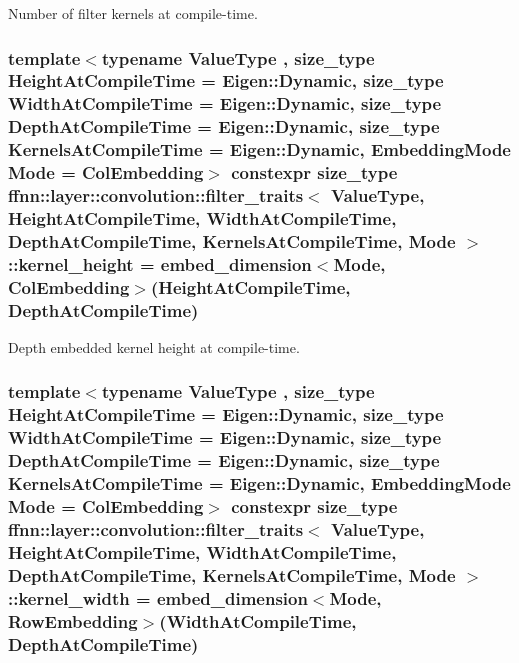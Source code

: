 Number of filter kernels at compile-\/time. 

\hypertarget{structffnn_1_1layer_1_1convolution_1_1filter__traits_a9d152e933408a27b106afc8b413a6132}{
\subsubsection[{kernel\-\_\-height}]{\setlength{\rightskip}{0pt plus 5cm}template$<$typename Value\-Type , size\-\_\-type Height\-At\-Compile\-Time = Eigen\-::\-Dynamic, size\-\_\-type Width\-At\-Compile\-Time = Eigen\-::\-Dynamic, size\-\_\-type Depth\-At\-Compile\-Time = Eigen\-::\-Dynamic, size\-\_\-type Kernels\-At\-Compile\-Time = Eigen\-::\-Dynamic, Embedding\-Mode Mode = Col\-Embedding$>$ constexpr {\bf size\-\_\-type} {\bf ffnn\-::layer\-::convolution\-::filter\-\_\-traits}$<$ Value\-Type, Height\-At\-Compile\-Time, Width\-At\-Compile\-Time, Depth\-At\-Compile\-Time, Kernels\-At\-Compile\-Time, Mode $>$\-::kernel\-\_\-height = {\bf embed\-\_\-dimension}$<$Mode, {\bf Col\-Embedding}$>$(Height\-At\-Compile\-Time, Depth\-At\-Compile\-Time)\hspace{0.3cm}{\ttfamily [static]}}}\label{structffnn_1_1layer_1_1convolution_1_1filter__traits_a9d152e933408a27b106afc8b413a6132}


Depth embedded kernel height at compile-\/time. 

\hypertarget{structffnn_1_1layer_1_1convolution_1_1filter__traits_adcec5284173f864350dc21be87ed9f1a}{
\subsubsection[{kernel\-\_\-width}]{\setlength{\rightskip}{0pt plus 5cm}template$<$typename Value\-Type , size\-\_\-type Height\-At\-Compile\-Time = Eigen\-::\-Dynamic, size\-\_\-type Width\-At\-Compile\-Time = Eigen\-::\-Dynamic, size\-\_\-type Depth\-At\-Compile\-Time = Eigen\-::\-Dynamic, size\-\_\-type Kernels\-At\-Compile\-Time = Eigen\-::\-Dynamic, Embedding\-Mode Mode = Col\-Embedding$>$ constexpr {\bf size\-\_\-type} {\bf ffnn\-::layer\-::convolution\-::filter\-\_\-traits}$<$ Value\-Type, Height\-At\-Compile\-Time, Width\-At\-Compile\-Time, Depth\-At\-Compile\-Time, Kernels\-At\-Compile\-Time, Mode $>$\-::kernel\-\_\-width = {\bf embed\-\_\-dimension}$<$Mode, {\bf Row\-Embedding}$>$(Width\-At\-Compile\-Time, Depth\-At\-Compile\-Time)\hspace{0.3cm}{\ttfamily [static]}}}\label{structffnn_1_1layer_1_1convolution_1_1filter__traits_adcec5284173f864350dc21be87ed9f1a}


